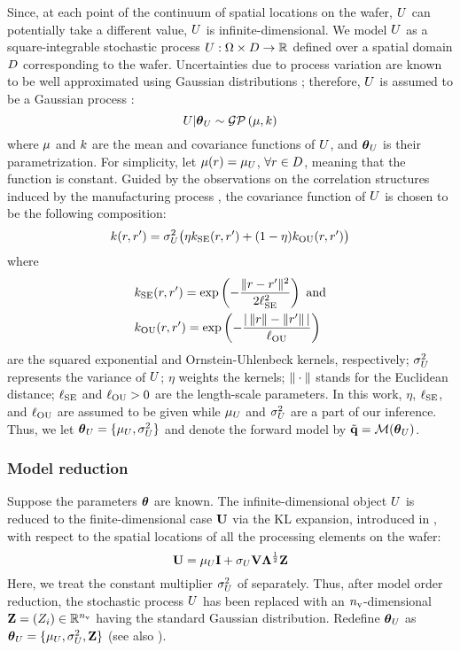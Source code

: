 Since, at each point of the continuum of spatial locations on the wafer, $U$ can potentially take a different value, $U$ is infinite-dimensional. We model $U$ as a square-integrable stochastic process $U: \Omega \times D \to \mathbb{R}$ defined over a spatial domain $D$ corresponding to the wafer. Uncertainties due to process variation are known to be well approximated using Gaussian distributions \cite{srivastava2010}; therefore, $U$ is assumed to be a Gaussian process \cite{rasmussen2006}:
\[
  \U | \vparam_\U \sim \gaussianp{\fMean}{\fCov}
\]
where $\fMean$ and $\fCov$ are the mean and covariance functions of $U$, and ${\boldsymbol\theta}_U$ is their parametrization. For simplicity, let $\fMean{\r} = \mu_\U$, $\forall r \in D$, meaning that the function is constant. Guided by the observations on the correlation structures induced by the manufacturing process \cite{cheng2011}, the covariance function of $U$ is chosen to be the following composition:
\begin{equation} \elabel{covariance-function}
  \fCov{\r, \r'} = \sigma_\U^2 \big( \eta \fCov_\SE(\r, \r') + (1 - \eta) \fCov_\OU(\r, \r') \big)
\end{equation}
where
\begin{align*}
  & \fCov_\SE(\r, \r') = \exp\left(-\frac{\norm{\r - \r'}^2}{2 \ell_\SE^2}\right) \text{ and} \\
  & \fCov_\OU(\r, \r') = \exp\left(- \frac{\abs{\,\norm{\r} - \norm{\r'}\,}}{\ell_\OU} \right)
\end{align*}
are the squared exponential and Ornstein-Uhlenbeck kernels, respectively; $\sigma_U^2$ represents the variance of $U$; $\eta$ weights the kernels; $\| \cdot \|$ stands for the Euclidean distance; $\ell_{\text{SE}}$ and $\ell_{\text{OU}} > 0$ are the length-scale parameters. In this work, $\eta$, $\ell_{\text{SE}}$, and $\ell_{\text{OU}}$ are assumed to be given while $\mu_U$ and $\sigma^2_U$ are a part of our inference. Thus, we let ${\boldsymbol\theta}_U = \{ \mu_U, \sigma_U^2 \}$ and denote the forward model by $\mvT = \model{\vparam_\U}$.

\subsubsection{Model reduction}
Suppose the parameters ${\boldsymbol\theta}$ are known. The infinite-dimensional object $U$ is reduced to the finite-dimensional case $\mathbf{U}$ via the KL expansion, introduced in , with respect to the spatial locations of all the processing elements on the wafer:
\begin{equation} \elabel{kl-approximation}
  \vU = \mu_\U \mI + \sigma_\U \m{V} \m{\Lambda}^\frac{1}{2} \vZ
\end{equation}
Here, we treat the constant multiplier $\sigma^2_U$ of  separately. Thus, after model order reduction, the stochastic process $U$ has been replaced with an ${n_\text{v}}$-dimensional \rv\ $\mathbf{Z} = (Z_i) \in \mathbb{R}^{n_\text{v}}$ having the standard Gaussian distribution. Redefine ${\boldsymbol\theta}_U$ as ${\boldsymbol\theta}_U = \{ \mu_U, \sigma_U^2, \mathbf{Z} \}$ (see also \cite{marzouk2009}).

